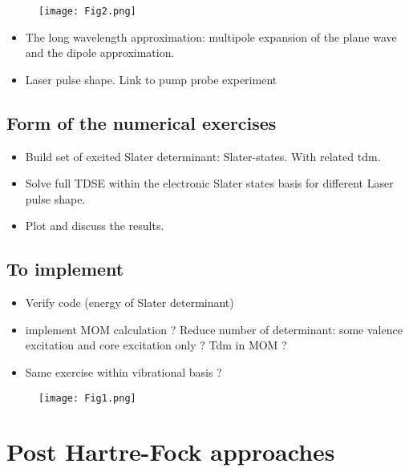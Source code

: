 \documentclass[12pt]{article}
\begin{document}
\begin{figure}[h!]
\texttt{[image: Fig2.png]}
\end{figure}

\begin{itemize}
\item The long wavelength approximation: multipole expansion of the plane wave and the dipole approximation.
\item Laser pulse shape. Link to pump probe experiment
\end{itemize}

\subsection{Form of the numerical exercises}
\begin{itemize}
\item Build set of excited Slater determinant: Slater-states. With related tdm. 
\item Solve full TDSE within the electronic Slater states basis for different Laser pulse shape. 
\item Plot and discuss the results. 
\end{itemize}

\subsection{To implement}
\begin{itemize}
\item Verify code (energy of Slater determinant)
\item implement MOM calculation ? Reduce number of determinant: some valence excitation and core excitation only ? Tdm in MOM ?
\item Same exercise within vibrational basis ? 
\end{itemize}

\begin{figure}[h!]
\texttt{[image: Fig1.png]}
\end{figure}

\section{Post Hartre-Fock approaches}
\end{document}
